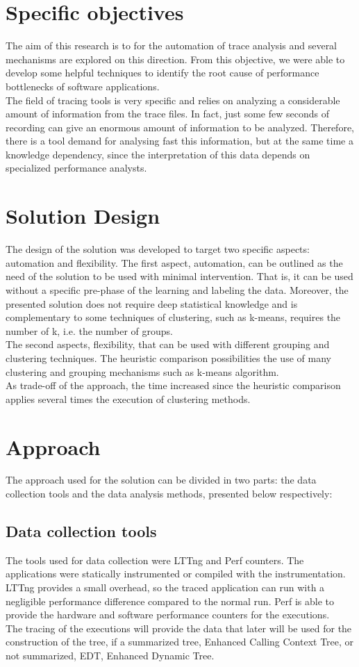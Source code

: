 \section{Specific objectives}
The aim of this research is to for the automation of trace analysis and several mechanisms are explored on this direction. From this objective, we were able to develop some helpful techniques to identify the root cause of performance bottlenecks of software applications.\\
The field of tracing tools is very specific and relies on analyzing a considerable amount of information from the trace files. In fact, just some few seconds of recording can give an enormous amount of information to be analyzed. Therefore, there is a tool demand for analysing fast this information, but at the same time a knowledge dependency, since the interpretation of this data depends on specialized performance analysts.  

\section{Solution Design}
The design of the solution was developed to target two specific aspects: automation and flexibility. 
The first aspect, automation, can be outlined as the need of the solution to be used with minimal intervention. That is, it can be used without a specific pre-phase of the learning and labeling the data. Moreover, the presented solution does not require deep statistical knowledge and is complementary to some techniques of clustering, such as k-means, requires the number of k, i.e. the number of groups.\\
The second aspects, flexibility,  that can be used with different grouping and clustering techniques. The heuristic comparison possibilities the use of many clustering and grouping mechanisms such as k-means algorithm.\\
As trade-off of the approach, the time increased since the heuristic comparison applies several times the execution of clustering methods.
\section{Approach}
The approach used for the solution can be divided in two parts: the data collection tools and the data analysis methods, presented below respectively:
\subsection{Data collection tools}
The tools used for data collection were LTTng and Perf counters. The applications were statically instrumented or compiled with the instrumentation. LTTng provides a small overhead, so the traced application can run with a negligible performance difference compared to the normal run. Perf is able to provide the hardware and software performance counters for the executions.\\
The tracing of the executions will provide the data that later will be used for the construction of the tree, if a summarized tree, Enhanced Calling Context Tree, or not summarized, EDT, Enhanced Dynamic Tree.
